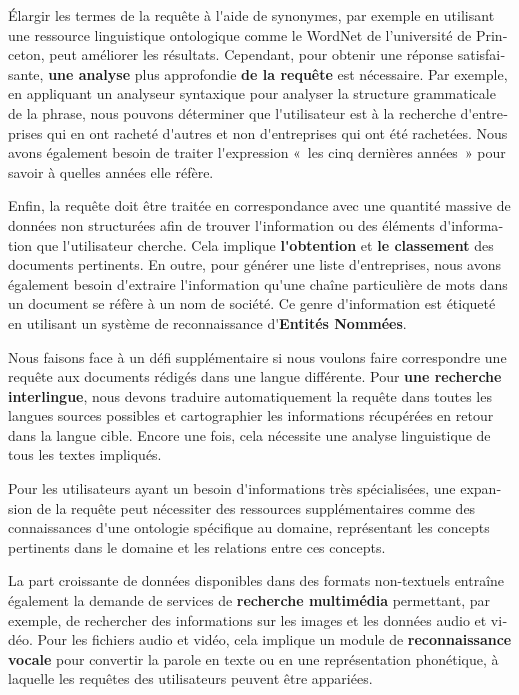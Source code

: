 \documentclass[]{../metanetpaper}
\begin{document}
\begin{french}
\begin{multicols}{2}
Élargir les termes de la requête à l{\mbox '}aide de synonymes, par exemple en
utilisant une ressource linguistique ontologique comme le WordNet de
l'université de Princeton, peut améliorer les résultats. Cependant, pour obtenir une
réponse satisfaisante, {\bf une analyse} plus approfondie {\bf de la requête} est
nécessaire. Par exemple, en appliquant un analyseur syntaxique pour
analyser la structure grammaticale de la phrase, nous pouvons
déterminer que l{\mbox '}utilisateur est à la recherche d{\mbox '}entreprises qui en
ont racheté d{\mbox '}autres et non d{\mbox '}entreprises qui ont été rachetées. Nous
avons également besoin de traiter l{\mbox '}expression «~les cinq dernières
  années~» pour savoir à quelles années elle réfère.

Enfin, la requête doit être traitée en correspondance avec une
quantité massive de données non structurées afin de trouver
l{\mbox '}information ou des éléments d{\mbox '}information que l{\mbox '}utilisateur
cherche. Cela implique {\bf l{\mbox '}obtention} et {\bf le classement} des documents
pertinents. En outre, pour générer une liste d{\mbox '}entreprises, nous avons
également besoin d{\mbox '}extraire l{\mbox '}information qu{\mbox '}une chaîne particulière
de mots dans un document se réfère à un nom de société. Ce genre
d{\mbox '}information est étiqueté en utilisant un système de reconnaissance
d{\mbox '}{\bf Entités Nommées}.

Nous faisons face à un défi supplémentaire si nous voulons faire
correspondre une requête aux documents rédigés dans une langue
différente. Pour {\bf une recherche interlingue}, nous devons traduire
automatiquement la requête dans toutes les langues sources possibles
et cartographier les informations récupérées en retour dans la langue
cible. Encore une fois, cela nécessite une analyse linguistique de
tous les textes impliqués.

Pour les utilisateurs ayant un besoin d{\mbox '}informations très
spécialisées, une expansion de la requête peut nécessiter des
ressources supplémentaires comme des connaissances d{\mbox '}une ontologie
spécifique au domaine, représentant les concepts pertinents dans le
domaine et les relations entre ces concepts.

La part croissante de données disponibles dans des formats non-textuels
entraîne également la demande de services de {\bf recherche multimédia}
permettant, par exemple, de rechercher des informations sur les
images et les données audio et vidéo. Pour les fichiers audio et vidéo, cela
implique un module de {\bf reconnaissance vocale} pour convertir la parole
en texte ou en une représentation phonétique, à laquelle les requêtes
des utilisateurs peuvent être appariées.


\end{multicols}
\end{french}
\end{document}
